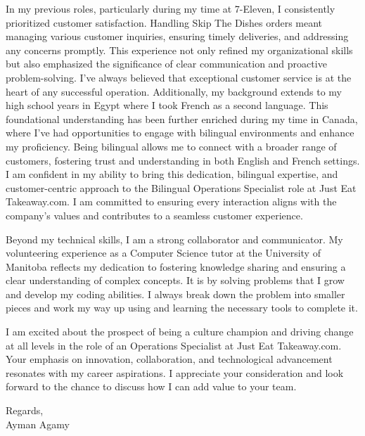 \documentclass{article}
\begin{document}
    \vspace{1em}

    \noindent
    In my previous roles, particularly during my time at 7-Eleven, I consistently prioritized customer satisfaction.
    Handling Skip The Dishes orders meant managing various customer inquiries, ensuring timely deliveries, and
    addressing any concerns promptly. This experience not only refined my organizational skills but also emphasized
    the significance of clear communication and proactive problem-solving. I've always believed that exceptional
    customer service is at the heart of any successful operation. Additionally, my background extends to my high
    school years in Egypt where I took French as a second language. This foundational understanding has been further
    enriched during my time in Canada, where I've had opportunities to engage with bilingual environments and enhance
    my proficiency. Being bilingual allows me to connect with a broader range of customers, fostering trust and
    understanding in both English and French settings. I am confident in my ability to bring this dedication,
    bilingual expertise, and customer-centric approach to the Bilingual Operations Specialist role at Just Eat
    Takeaway.com. I am committed to ensuring every interaction aligns with the company's values and contributes to a
    seamless customer experience.

    \vspace{1em}

    \noindent
    Beyond my technical skills, I am a strong collaborator and communicator. My volunteering experience as a Computer
    Science tutor at the University of Manitoba reflects my dedication to fostering knowledge sharing and ensuring a
    clear understanding of complex concepts. It is by solving problems that I grow and develop my coding abilities. I
    always break down the problem into smaller pieces and work my way up using and learning the necessary tools to
    complete it.

    \vspace{1em}

    \noindent
    I am excited about the prospect of being a culture champion and driving change at all levels in the role of an
    Operations Specialist at Just Eat Takeaway.com. Your emphasis on innovation, collaboration, and technological
    advancement resonates with my career aspirations. I appreciate your consideration and look forward to the chance
    to discuss how I can add value to your team.

    \vspace{1em}

    \noindent
    Regards, \\
    Ayman Agamy
\end{document}
